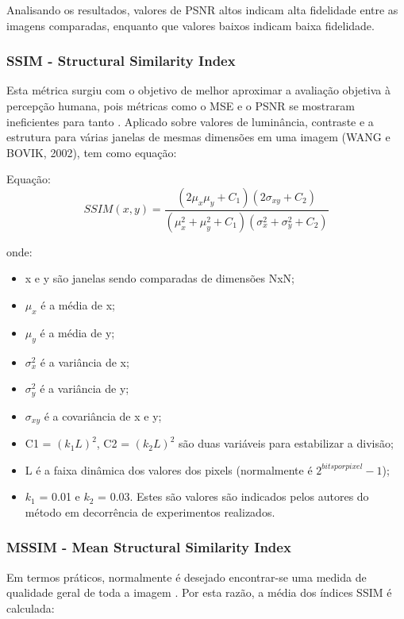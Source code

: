 Analisando os resultados, valores de PSNR altos indicam alta fidelidade entre as imagens comparadas, enquanto que valores baixos indicam baixa fidelidade.

\subsubsection[SSIM]{SSIM - Structural Similarity Index}

Esta métrica surgiu com o objetivo de melhor aproximar a avaliação objetiva à percepção humana, pois métricas como o MSE e o PSNR se mostraram ineficientes para tanto \cite{emmersonsilva}. Aplicado sobre valores de luminância, contraste e a estrutura para várias janelas de mesmas dimensões em uma imagem (WANG e BOVIK, 2002), tem como equação:

    Equação: \[SSIM(x, y) = \frac{(2\mu_{x}\mu_{y} + C_{1})(2\sigma_{xy} + C_{2})} {(\mu_{x}^{2} + \mu_{y}^{2}+C_{1})(\sigma_{x}^{2} + \sigma_{y}^{2}+C_{2})}\]

onde:
\begin{itemize}
	\item x e y são janelas sendo comparadas de dimensões NxN;
	\item \(\mu_{x}\) é a média de x;
    \item \(\mu_{y}\) é  a média de y;
    \item \(\sigma^{2}_{x}\) é a variância de x;
    \item \(\sigma^{2}_{y}\) é a variância de y;
    \item \(\sigma_{xy}\) é a covariância de x e y;
    \item C1 = \((k_{1}L)^{2}\), C2 = \((k_{2}L)^{2}\) são duas variáveis para estabilizar a divisão;
    \item L é a faixa dinâmica dos valores dos pixels (normalmente é \(2^{bits por pixel} - 1\));
    \item \(k_{1}\) = 0.01 e \(k_{2}\) = 0.03. Estes são valores são indicados pelos autores do método \cite{wangbovik2004} em decorrência de experimentos realizados.
\end{itemize}

\subsubsection[MSSIM]{MSSIM - Mean Structural Similarity Index}

Em termos práticos, normalmente é desejado encontrar-se uma medida de qualidade geral de toda a imagem \cite{wangbovik2004}. Por esta razão, a média dos índices SSIM é calculada:

